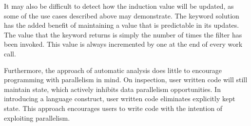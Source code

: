 
It may also be difficult to detect how the induction value will be
updated, as some of the use cases described above may demonstrate. The
keyword solution has the added benefit of maintaining a value that is
predictable in its updates. The value that the keyword returns is
simply the number of times the filter has been invoked. This value is
always incremented by one at the end of every work call.

Furthermore, the approach of automatic analysis does little to
encourage programming with parallelism in mind. On inspection, user
written code will still maintain state, which actively inhibits data
parallelism opportunities. In introducing a language construct, user
written code eliminates explicitly kept state. This approach
encourages users to write code with the intention of exploiting
parallelism.


